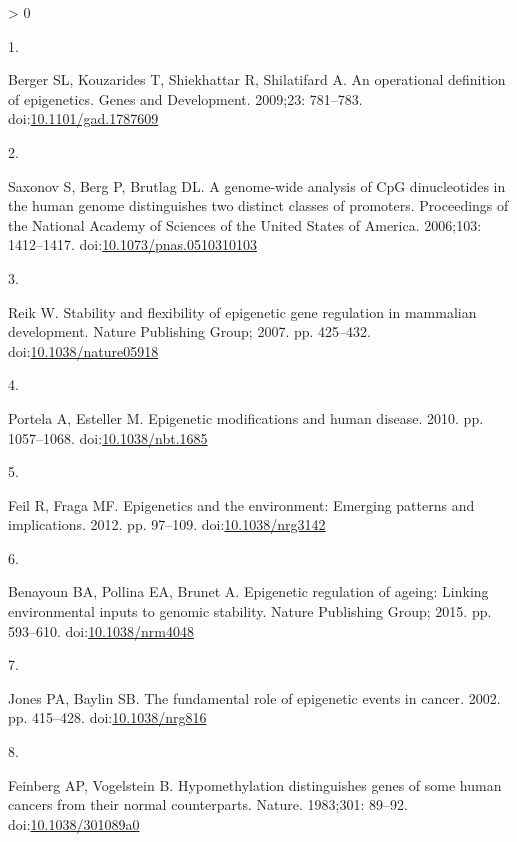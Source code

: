 \documentclass[10pt,letterpaper]{article}
\newlength{\csllabelwidth}
\newlength{\cslhangindent}
\newenvironment{CSLReferences}[3] %
 {%
  \setlength{\parindent}{0pt}
  \ifodd #1 \everypar{\setlength{\hangindent}{\cslhangindent}}\ignorespaces\fi
  \ifnum #2 > 0
  \setlength{\parskip}{#2\baselineskip}
  \fi
 }%
 {}
\newcommand{\CSLLeftMargin}[1]{\parbox[t]{\csllabelwidth}{#1}}
\newcommand{\CSLRightInline}[1]{\parbox[t]{\linewidth - \csllabelwidth}{#1}}
\begin{document}
\hypertarget{refs}{}
\begin{CSLReferences}{0}{0}
\leavevmode\hypertarget{ref-Berger2009}{}%
\CSLLeftMargin{1. }
\CSLRightInline{Berger SL, Kouzarides T, Shiekhattar R, Shilatifard A.
{An operational definition of epigenetics}. Genes and Development.
2009;23: 781--783.
doi:\href{https://doi.org/10.1101/gad.1787609}{10.1101/gad.1787609}}

\leavevmode\hypertarget{ref-Saxonov2006}{}%
\CSLLeftMargin{2. }
\CSLRightInline{Saxonov S, Berg P, Brutlag DL. {A genome-wide analysis
of CpG dinucleotides in the human genome distinguishes two distinct
classes of promoters}. Proceedings of the National Academy of Sciences
of the United States of America. 2006;103: 1412--1417.
doi:\href{https://doi.org/10.1073/pnas.0510310103}{10.1073/pnas.0510310103}}

\leavevmode\hypertarget{ref-Reik2007}{}%
\CSLLeftMargin{3. }
\CSLRightInline{Reik W. {Stability and flexibility of epigenetic gene
regulation in mammalian development}. Nature Publishing Group; 2007. pp.
425--432.
doi:\href{https://doi.org/10.1038/nature05918}{10.1038/nature05918}}

\leavevmode\hypertarget{ref-Portela2010}{}%
\CSLLeftMargin{4. }
\CSLRightInline{Portela A, Esteller M. {Epigenetic modifications and
human disease}. 2010. pp. 1057--1068.
doi:\href{https://doi.org/10.1038/nbt.1685}{10.1038/nbt.1685}}

\leavevmode\hypertarget{ref-Feil2012}{}%
\CSLLeftMargin{5. }
\CSLRightInline{Feil R, Fraga MF. {Epigenetics and the environment:
Emerging patterns and implications}. 2012. pp. 97--109.
doi:\href{https://doi.org/10.1038/nrg3142}{10.1038/nrg3142}}

\leavevmode\hypertarget{ref-Benayoun2015}{}%
\CSLLeftMargin{6. }
\CSLRightInline{Benayoun BA, Pollina EA, Brunet A. {Epigenetic
regulation of ageing: Linking environmental inputs to genomic
stability}. Nature Publishing Group; 2015. pp. 593--610.
doi:\href{https://doi.org/10.1038/nrm4048}{10.1038/nrm4048}}

\leavevmode\hypertarget{ref-Jones2002}{}%
\CSLLeftMargin{7. }
\CSLRightInline{Jones PA, Baylin SB. {The fundamental role of epigenetic
events in cancer}. 2002. pp. 415--428.
doi:\href{https://doi.org/10.1038/nrg816}{10.1038/nrg816}}

\leavevmode\hypertarget{ref-Feinberg1983}{}%
\CSLLeftMargin{8. }
\CSLRightInline{Feinberg AP, Vogelstein B. {Hypomethylation
distinguishes genes of some human cancers from their normal
counterparts}. Nature. 1983;301: 89--92.
doi:\href{https://doi.org/10.1038/301089a0}{10.1038/301089a0}}


\end{CSLReferences}
\end{document}
